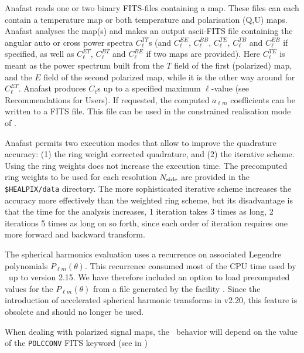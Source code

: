\begin{qualifiers}
\begin{qulist}{}
  \end{qulist}
\end{qualifiers}
\vfill

\begin{codedescription}
{Anafast reads one or two binary FITS-files containing a \healpix map. These
files can each contain
a temperature map or both temperature and polarisation (Q,U) maps. Anafast analyses
the map(s) and makes an output ascii-FITS file containing the angular auto or cross
power spectra $C^{TT}_\ell$s
(and $C^{EE}_\ell$, $C^{BB}_\ell$, $C^{TE}_\ell$, $C^{TB}_\ell$ and $C^{EB}_\ell$ if specified, as well
as $C^{ET}_\ell$, $C^{BT}_\ell$ and $C^{BE}_\ell$ if two maps are provided). 
Here $C^{TE}_\ell$ is meant as the power
spectrum built from the $T$ field of the first (polarized) map, and the $E$
field of the second polarized map, while it is the other way around for $C^{ET}_\ell$.
Anafast produces $C_\ell$s up to a specified maximum $\ell$-value
(see Recommendations for Users). 
If requested, the computed $a_{\ell m}$ coefficients 
can  be written to a FITS file. This file can be used in the 
constrained realisation mode  of  . 

Anafast permits two execution modes that allow to improve 
the quadrature accuracy: 
(1) the  ring weight corrected quadrature, and
(2)  the  iterative scheme. 
Using the ring weights does not increase the execution time.  
The precomputed ring weights to be used for each 
\healpix resolution $N_{\mathrm{side}}$ are provided in
the {\tt \$HEALPIX/data} directory. 
The more sophisticated iterative scheme increases the
accuracy more effectively than the weighted ring scheme,
but its disadvantage is that the time for the analysis
increases, 1 iteration takes 3 times as long, 2 iterations 5 times as
long on so forth, since each order of iteration requires one more forward
and backward transform. 

The spherical harmonics evaluation uses  a
recurrence on associated Legendre polynomials $P_{\ell m}(\theta)$. 
This recurrence consumed most of the CPU time used by \thedocid\ up to version
2.15. We have therefore included an option to load precomputed values for the
$P_{\ell m}(\theta)$ from a file generated by the \healpix facility
. Since the introduction of accelerated spherical
harmonic transforms in \healpix v2.20, this feature is obsolete and should no
longer be used. 

When dealing with polarized signal maps, the \thedocid\ behavior will depend on the value of the \texttt{POLCCONV} FITS keyword
(see  in )
}
\end{codedescription}

